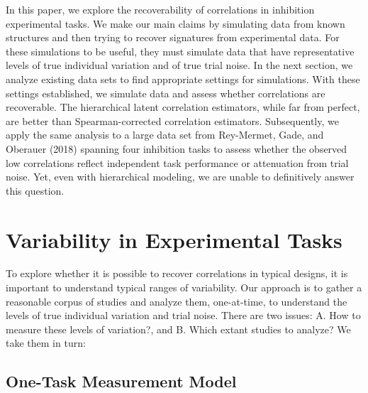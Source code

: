 \documentclass[
  english,
  ,man]{apa6}
\begin{document}
In this paper, we explore the recoverability of correlations in inhibition experimental tasks. We make our main claims by simulating data from known structures and then trying to recover signatures from experimental data. For these simulations to be useful, they must simulate data that have representative levels of true individual variation and of true trial noise. In the next section, we analyze existing data sets to find appropriate settings for simulations. With these settings established, we simulate data and assess whether correlations are recoverable. The hierarchical latent correlation estimators, while far from perfect, are better than Spearman-corrected correlation estimators. Subsequently, we apply the same analysis to a large data set from Rey-Mermet, Gade, and Oberauer (2018) spanning four inhibition tasks to assess whether the observed low correlations reflect independent task performance or attenuation from trial noise. Yet, even with hierarchical modeling, we are unable to definitively answer this question.

\hypertarget{variability-in-experimental-tasks}{%
\section{Variability in Experimental Tasks}\label{variability-in-experimental-tasks}}

To explore whether it is possible to recover correlations in typical designs, it is important to understand typical ranges of variability. Our approach is to gather a reasonable corpus of studies and analyze them, one-at-time, to understand the levels of true individual variation and trial noise. There are two issues: A. How to measure these levels of variation?, and B. Which extant studies to analyze? We take them in turn:

\hypertarget{one-task-measurement-model}{%
\subsection{One-Task Measurement Model}\label{one-task-measurement-model}}
\end{document}
